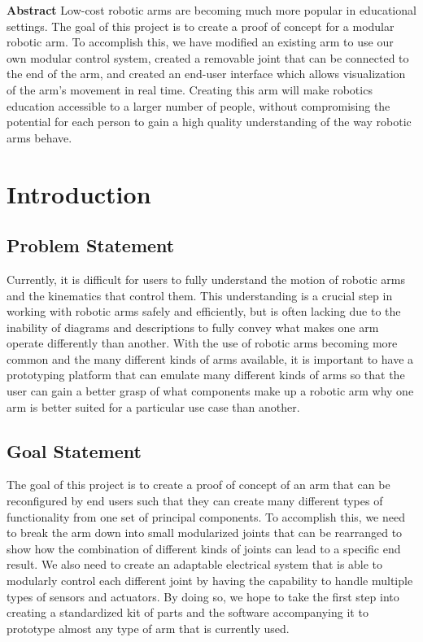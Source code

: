 \noindent \newline 
\textbf{Abstract}
Low-cost robotic arms are becoming much more popular in educational settings. The goal of this project is to create a proof of concept for a modular robotic arm. To accomplish this, we have modified an existing arm to use our own modular control system, created a removable joint that can be connected to the end of the arm, and created an end-user interface which allows visualization of the arm’s movement in real time. Creating this arm will make robotics education accessible to a larger number of people, without compromising the potential for each person to gain a high quality understanding of the way robotic arms behave. \\
\newpage

\section{Introduction} 

\subsection{Problem Statement}
\noindent Currently, it is difficult for users to fully understand the motion of robotic arms and the kinematics that control them. This understanding is a crucial step in working with robotic arms safely and efficiently, but is often lacking due to the inability of diagrams and descriptions to fully convey what makes one arm operate differently than another. With the use of robotic arms becoming more common and the many different kinds of arms available, it is important to have a prototyping platform that can emulate many different kinds of arms so that the user can gain a better grasp of what components make up a robotic arm why one arm is better suited for a particular use case than another.

\subsection{Goal Statement}
The goal of this project is to create a proof of concept of an arm that can be reconfigured by end users such that they can create many different types of functionality from one set of principal components. To accomplish this, we need to break the arm down into small modularized joints that can be rearranged to show how the combination of different kinds of joints can lead to a specific end result. We also need to create an adaptable electrical system that is able to modularly control each different joint by having the capability to handle multiple types of sensors and actuators. By doing so, we hope to take the first step into creating a standardized kit of parts and the software accompanying it to prototype almost any type of arm that is currently used. 

